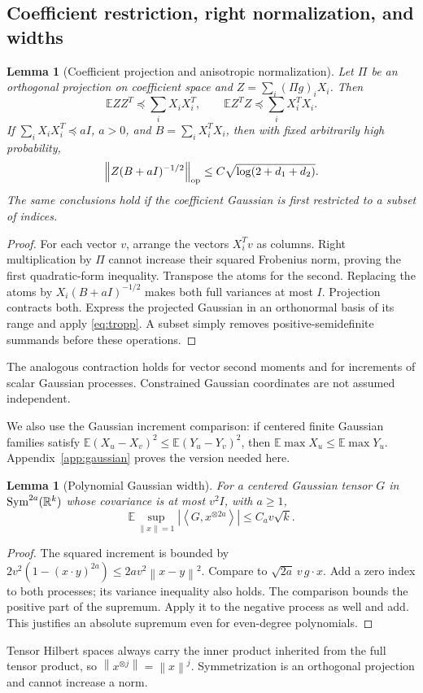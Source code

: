 \documentclass[11pt]{article}
\newtheorem{lemma}[theorem]{Lemma}
\theoremstyle{remark}\newtheorem{remark}[theorem]{Remark}
\newcommand{\R}{\mathbb R}\newcommand{\E}{\mathbb E}\newcommand{\Prob}{\mathbb P}
\newcommand{\norm}[1]{\left\|#1\right\|}\newcommand{\ip}[2]{\left\langle #1,#2\right\rangle}
\begin{document}
\subsection{Coefficient restriction, right normalization, and widths}
\begin{lemma}[Coefficient projection and anisotropic normalization]\label{lem:variance}
Let $\Pi$ be an orthogonal projection on coefficient space and $Z=\sum_i(\Pi g)_iX_i$. Then
\[
 \E ZZ^T\preceq\sum_iX_iX_i^T,\qquad \E Z^TZ\preceq\sum_iX_i^TX_i.
\]
If $\sum_iX_iX_i^T\preceq aI$, $a>0$, and $B=\sum_iX_i^TX_i$, then with fixed arbitrarily high probability,
\begin{equation}\label{eq:aniso}
 \norm{Z(B+aI)^{-1/2}}_{\op}\le C\sqrt{\log(2+d_1+d_2)}.
\end{equation}
The same conclusions hold if the coefficient Gaussian is first restricted to a subset of indices.
\end{lemma}
\begin{proof}
For each vector $v$, arrange the vectors $X_i^Tv$ as columns. Right multiplication by $\Pi$ cannot increase their squared Frobenius norm, proving the first quadratic-form inequality. Transpose the atoms for the second. Replacing the atoms by $X_i(B+aI)^{-1/2}$ makes both full variances at most $I$. Projection contracts both. Express the projected Gaussian in an orthonormal basis of its range and apply \eqref{eq:tropp}. A subset simply removes positive-semidefinite summands before these operations.
\end{proof}
The analogous contraction holds for vector second moments and for increments of scalar Gaussian processes. Constrained Gaussian coordinates are not assumed independent.

We also use the Gaussian increment comparison: if centered finite Gaussian families satisfy $\E(X_u-X_v)^2\le\E(Y_u-Y_v)^2$, then $\E\max X_u\le\E\max Y_u$. Appendix~\ref{app:gaussian} proves the version needed here.
\begin{lemma}[Polynomial Gaussian width]\label{lem:width}
For a centered Gaussian tensor $G$ in $\Sym^{2a}(\R^k)$ whose covariance is at most $v^2I$, with $a\ge1$,
\[
 \E\sup_{\norm x=1}|\ip{G}{x^{\otimes2a}}|\le C_a v\sqrt{k}.
\]
\end{lemma}
\begin{proof}
The squared increment is bounded by $2v^2(1-(x\cdot y)^{2a})\le2av^2\norm{x-y}^2$. Compare to $\sqrt{2a}\,v\,g\cdot x$. Add a zero index to both processes; its variance inequality also holds. The comparison bounds the positive part of the supremum. Apply it to the negative process as well and add. This justifies an absolute supremum even for even-degree polynomials.
\end{proof}
Tensor Hilbert spaces always carry the inner product inherited from the full tensor product, so $\norm{x^{\otimes j}}=\norm x^j$. Symmetrization is an orthogonal projection and cannot increase a norm.
\end{document}

